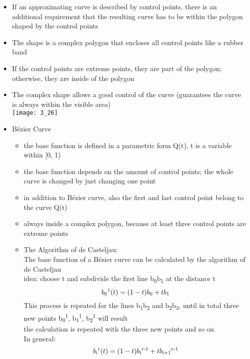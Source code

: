 \documentclass{standalone}
\begin{document}
\begin{itemize}
	\item If an approximating curve is described by control points, there is an additional requirement that the resulting curve has to be within the polygon shaped by the control points
	\item The shape is a complex polygon that encloses all control points like a rubber band
	\item If the control points are extreme points, they are part of the polygon; otherwise, they are inside of the polygon
	\item The complex shape allows a good control of the curve (guarantees the curve is always within the visible area)\\
\texttt{[image: 3\_26]}
	\item B\'ezier Curve
	\begin{itemize}
		\item the base function is defined in a parametric form Q(t), t is a variable within [0, 1)
		\item the base function depends on the amount of control points; the whole curve is changed by just changing one point
		\item in addition to B\'ezier curve, also the first and last control point belong to the curve Q(t)
		\item always inside a complex polygon, because at least three control points are extreme points
		\item The Algorithm of de Casteljau: \\
		The base function of a B\'ezier curve can be calculated by the algorithm of de Casteljau\\
		idea: choose t and subdivide the first line b\textsubscript{0}b\textsubscript{1} at the distance t
		\begin{equation}
			b\textsubscript{0}\textsuperscript{1}(t) = (1-t)b\textsubscript{0}+t b\textsubscript{1}
		\end{equation}
		This process is repeated for the lines b\textsubscript{1}b\textsubscript{2} and b\textsubscript{2}b\textsubscript{3}, until in total three new points b\textsubscript{0}\textsuperscript{1}, b\textsubscript{1}\textsuperscript{1}, b\textsubscript{2}\textsuperscript{1} will result \\
		the calculation is repeated with the three new points and so on \\
		In general:
		\begin{equation}
			b\textsubscript{i}\textsuperscript{r}(t) = (1-t)b\textsubscript{i}\textsuperscript{r-1}+t b\textsubscript{i+1}\textsuperscript{r-1}

\end{equation}
\end{itemize}
\end{itemize}
\end{document}
